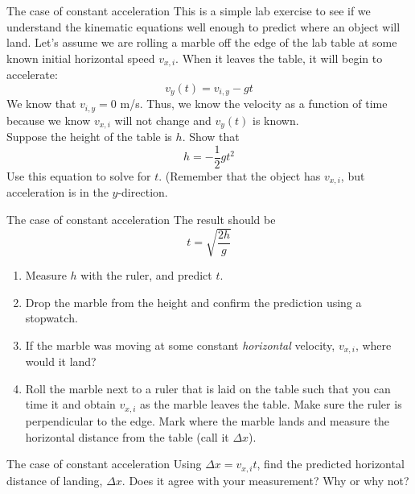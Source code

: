 \documentclass{beamer}
\begin{document}
\begin{frame}{The case of constant acceleration}
\small
This is a simple lab exercise to see if we understand the kinematic equations well enough to predict where an object will land.  Let's assume we are rolling a marble off the edge of the lab table at some known initial horizontal speed $v_{x,i}$.  When it leaves the table, it will begin to accelerate:
\begin{equation}
v_y(t) = v_{i,y} - g t
\end{equation}
We know that $v_{i,y} = 0$ m/s.  Thus, we know the velocity as a function of time because we know $v_{x,i}$ will not change and $v_y(t)$ is known. \\ \vspace{0.5cm}
Suppose the height of the table is $h$.  Show that
\begin{equation}
h = -\frac{1}{2}g t^2
\end{equation}
Use this equation to solve for $t$. (Remember that the object has $v_{x,i}$, but acceleration is in the $y$-direction.
\end{frame}

\begin{frame}{The case of constant acceleration}
\small
The result should be
\begin{equation}
t = \sqrt{\frac{2h}{g}}
\end{equation}
\begin{enumerate}
\item Measure $h$ with the ruler, and predict $t$.
\item Drop the marble from the height and confirm the prediction using a stopwatch.
\item If the marble was moving at some constant \textit{horizontal} velocity, $v_{x,i}$, where would it land?
\item Roll the marble next to a ruler that is laid on the table such that you can time it and obtain $v_{x,i}$ as the marble leaves the table.  Make sure the ruler is perpendicular to the edge.  Mark where the marble lands and measure the horizontal distance from the table (call it $\Delta x$).
\end{enumerate}
\end{frame}

\begin{frame}{The case of constant acceleration}
Using $\Delta x = v_{x,i} t$, find the predicted horizontal distance of landing, $\Delta x$.  Does it agree with your measurement?  Why or why not?
\end{frame}
\end{document}
